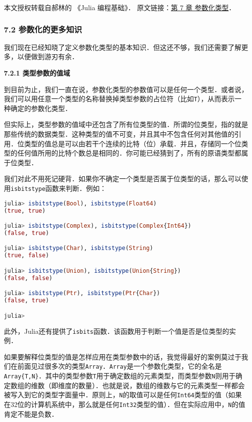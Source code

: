 
本文授权转载自郝林的 《Julia 编程基础》． 原文链接：\href{https://github.com/hyper0x/JuliaBasics/blob/master/book/ch07.md}{第 7 章 参数化类型}．


\subsubsection{7.2 参数化的更多知识}

我们现在已经知晓了定义参数化类型的基本知识．但这还不够，我们还需要了解更多，以便做到游刃有余．

\textbf{7.2.1 类型参数的值域}

到目前为止，我们一直在说，参数化类型的参数值可以是任何一个类型．或者说，我们可以用任意一个类型的名称替换掉类型参数的占位符（比如\verb|T|），从而表示一种确定的参数化类型．

但实际上，类型参数的值域中还包含了所有位类型的值．所谓的位类型，指的就是那些传统的数据类型．这种类型的值不可变，并且其中不包含任何对其他值的引用．位类型的值总是可以由若干个连续的比特（位）承载．并且，存储同一个位类型的任何值所用的比特个数总是相同的．你可能已经猜到了，所有的原语类型都属于位类型．

我们对此不用死记硬背．如果你不确定一个类型是否属于位类型的话，那么可以使用\verb|isbitstype|函数来判断．例如：
\begin{lstlisting}[language=julia]
julia> isbitstype(Bool), isbitstype(Float64)
(true, true)

julia> isbitstype(Complex), isbitstype(Complex{Int64})
(false, true)

julia> isbitstype(Char), isbitstype(String)
(true, false)

julia> isbitstype(Union), isbitstype(Union{String})
(false, false)

julia> isbitstype(Ptr), isbitstype(Ptr{Char})
(false, true)

julia> 
\end{lstlisting}

此外，Julia还有提供了\verb|isbits|函数．该函数用于判断一个值是否是位类型的实例．

如果要解释位类型的值是怎样应用在类型参数中的话，我觉得最好的案例莫过于我们在前面见过很多次的类型\verb|Array|．\verb|Array|是一个参数化类型，它的全名是\verb|Array{T,N}|．其中的类型参数\verb|T|用于确定数组的元素类型，而类型参数\verb|N|则用于确定数组的维数（即维度的数量）．也就是说，数组的维数与它的元素类型一样都会被写入到它的类型字面量中．原则上，\verb|N|的取值可以是任何\verb|Int64|类型的值（如果在32位的计算机系统中，那么就是任何\verb|Int32|类型的值）．但在实际应用中，\verb|N|的值肯定不能是负数．

